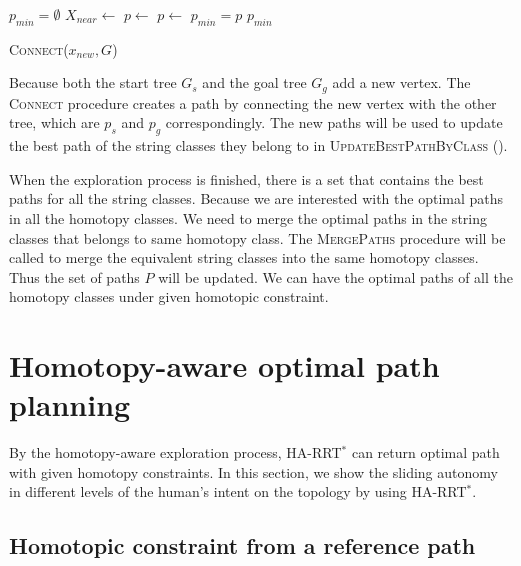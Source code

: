 \documentclass[letterpaper, 10 pt, conference]{ieeeconf}
\begin{document}
\begin{algorithm}[hbtp]
	\begin{algorithmic}[1]
		\State $ p_{min} = \emptyset $
		\State $ X_{near} \leftarrow $ 
					\State $ p \leftarrow $ 
				\Else
				    \State $ p \leftarrow $ 			
				\EndIf
			    	\State $ p_{min} = p $
			    \EndIf 
			\EndIf
		\EndFor
		\Return $ p_{min} $
	\end{algorithmic}
	\caption{ \textsc{Connect}($ x_{new}, G $) }
	\label{alg:harrt:binding}
\end{algorithm}

Because both the start tree $ G_{s} $ and the goal tree $ G_{g} $ add a new vertex. 
The \textsc{Connect} procedure creates a path by connecting the new vertex with the other tree, which are $ p_{s} $ and $ p_{g} $ correspondingly.
The new paths will be used to update the best path of the string classes they belong to in \textsc{UpdateBestPathByClass} ().

When the exploration process is finished, there is a set that contains the best paths for all the string classes.
Because we are interested with the optimal paths in all the homotopy classes.
We need to merge the optimal paths in the string classes that belongs to same homotopy class.
The \textsc{MergePaths} procedure will be called to merge the equivalent string classes into the same homotopy classes. 
Thus the set of paths $ P $ will be updated.
We can have the optimal paths of all the homotopy classes under given homotopic constraint.

\section{Homotopy-aware optimal path planning}
\label{sec:application}

By the homotopy-aware exploration process, HA-RRT$^{*}$ can return optimal path with given homotopy constraints.
In this section, we show the sliding autonomy in different levels of the human's intent on the topology by using HA-RRT$^{*}$.

\subsection{Homotopic constraint from a reference path}
\end{document}
